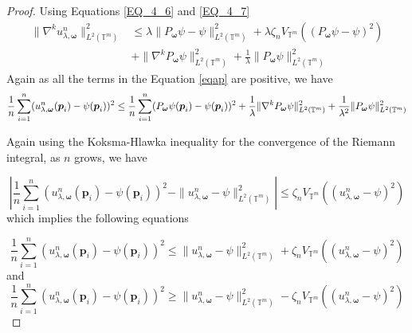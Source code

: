 \documentclass[multixcb]{amstext-l}
\theoremstyle{plain}
\theoremstyle{definition}
\theoremstyle{definition}
\theoremstyle{remark}
\numberwithin{equation}{chapter}
\begin{document}
\begin{proof}
Using Equations \ref{EQ_4_6} and \ref{EQ_4_7} \begin{equation}\label{grad_growth}
\begin{aligned}
    \|\nabla^ku_{\lambda,\boldsymbol{\omega}}^n\|_{L^2(\mathbb{T}^m)}^2 &\le \lambda\|P_{\boldsymbol{\omega}}\psi-\psi\|^2_{L^2(\mathbb{T}^m)} + \lambda\zeta_n V_{\mathbb{T}^m}((P_{\boldsymbol{\omega}}\psi-\psi)^2)\\
    &+ \|\nabla^kP_{\boldsymbol{\omega}}\psi\|_{L^2(\mathbb{T}^m)}^2 + \frac{1}{\lambda}\|P_{\boldsymbol{\omega}}\psi\|_{L^2(\mathbb{T}^m)}^2
\end{aligned}
\end{equation}
Again as all the terms in the Equation \ref{eqap} are positive, we have 
\begin{equation}\label{eq_sun}
    \frac{1}{n}\sum\limits_{i=1}^{n}(u_{\lambda,\boldsymbol{\omega}}^n(\boldsymbol{p}_i)-\psi(\boldsymbol{p}_i))^2 \le \\ \frac{1}{n}\sum\limits_{i=1}^{n}(P_{\boldsymbol{\omega}}\psi(\boldsymbol{p}_i)-\psi(\boldsymbol{p}_i))^2 + \frac{1}{\lambda}\|\nabla^kP_{\boldsymbol{\omega}}\psi\|_{L^2(\mathbb{T}^m)}^2 + \frac{1}{\lambda^2}\|P_{\boldsymbol{\omega}}\psi\|_{L^2(\mathbb{T}^m)}^2
\end{equation}

Again using the Koksma-Hlawka inequality \cite{kuipers2012uniform} for the convergence of the Riemann integral, as $n$ grows, we have   

\begin{equation}\label{IQ_3}
    \left|\frac{1}{n}\sum\limits_{i=1}^{n}(u_{\lambda,\boldsymbol{\omega}}^n(\boldsymbol{p}_i)-\psi(\boldsymbol{p}_i))^2 - \|u_{\lambda,\boldsymbol{\omega}}^n - \psi\|^2_{L^2(\mathbb{T}^m)} \right| \le  \zeta_n V_{\mathbb{T}^m}((u_{\lambda,\boldsymbol{\omega}}^n - \psi)^2) \end{equation}
which implies the following equations


\begin{equation}\label{eq_sun2}
    \frac{1}{n}\sum\limits_{i=1}^{n}(u_{\lambda,\boldsymbol{\omega}}^n(\boldsymbol{p}_i)-\psi(\boldsymbol{p}_i))^2 \le \|u_{\lambda,\boldsymbol{\omega}}^n - \psi\|^2_{L^2(\mathbb{T}^m)} + \zeta_n  V_{\mathbb{T}^m}((u_{\lambda,\boldsymbol{\omega}}^n - \psi)^2) \end{equation}
    and
\begin{equation}\label{IQ_4}
    \frac{1}{n}\sum\limits_{i=1}^{n}(u_{\lambda,\boldsymbol{\omega}}^n(\boldsymbol{p}_i)-\psi(\boldsymbol{p}_i))^2 \ge \|u_{\lambda,\boldsymbol{\omega}}^n - \psi\|^2_{L^2(\mathbb{T}^m)}  - \zeta_n V_{\mathbb{T}^m}((u_{\lambda,\boldsymbol{\omega}}^n - \psi)^2) \end{equation}



\end{proof}
\end{document}
